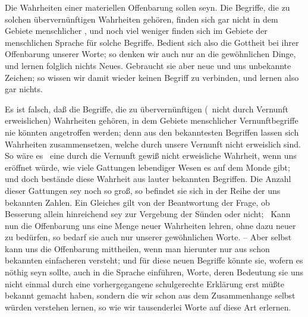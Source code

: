 Die Wahrheiten einer materiellen Offenbarung sollen  seyn. Die Begriffe, die zu solchen übervernünftigen Wahrheiten gehören, finden sich gar nicht in dem Gebiete menschlicher , und noch viel weniger finden sich im Gebiete der menschlichen Sprache  für solche Begriffe. Bedient sich also die Gottheit bei ihrer Offenbarung unserer  Worte; so denken wir auch nur an die gewöhnlichen Dinge, und lernen folglich nichts Neues. Gebraucht sie aber neue und uns unbekannte Zeichen; so wissen wir damit wieder keinen Begriff zu verbinden, und lernen also gar nichts.\par
{} Es ist falsch, daß die Begriffe, die zu übervernünftigen (\dh\ nicht durch Vernunft erweislichen) Wahrheiten gehören, in dem Gebiete menschlicher Vernunftbegriffe nie könnten angetroffen werden; denn aus den bekanntesten Begriffen lassen sich Wahrheiten zusammensetzen, welche durch unsere Vernunft nicht erweislich sind. So wäre es \zB\ eine durch die Vernunft gewiß nicht erweisliche Wahrheit, wenn uns eröffnet würde, wie viele Gattungen lebendiger Wesen es auf dem Monde gibt; und doch bestände diese Wahrheit aus lauter bekannten Begriffen. Die Anzahl dieser Gattungen sey noch so groß, so befindet sie sich in der Reihe der uns bekannten Zahlen. Ein Gleiches gilt von der Beantwortung der Frage, ob Besserung allein hinreichend sey zur Vergebung der Sünden oder nicht; \usf\ Kann nun die Offenbarung uns eine Menge neuer Wahrheiten lehren, ohne dazu neuer  zu bedürfen, so bedarf sie auch nur unserer gewöhnlichen Worte. -- Aber selbst  kann uns die Offenbarung mittheilen, wenn man hierunter nur  aus schon bekannten einfacheren versteht; und für diese neuen Begriffe könnte sie, wofern es nöthig seyn sollte, auch  in die Sprache einführen, Worte, deren Bedeutung sie uns nicht einmal durch eine vorhergegangene schulgerechte Erklärung erst müßte bekannt gemacht haben, sondern die wir schon aus dem Zusammenhange selbst würden verstehen lernen, so wie wir tausenderlei Worte auf diese Art erlernen.

